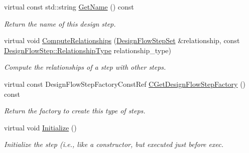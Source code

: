 \begin{DoxyCompactItemize}
virtual const std\+::string \hyperlink{classRTLCharacterization_a0b41ce2d4af25aa22e41dd9af50f1b0b}{Get\+Name} () const
\begin{DoxyCompactList}\small\item\em Return the name of this design step. \end{DoxyCompactList}\item 
virtual void \hyperlink{classRTLCharacterization_acb29748095419798f3ff059e7b00099f}{Compute\+Relationships} (\hyperlink{classDesignFlowStepSet}{Design\+Flow\+Step\+Set} \&relationship, const \hyperlink{classDesignFlowStep_a723a3baf19ff2ceb77bc13e099d0b1b7}{Design\+Flow\+Step\+::\+Relationship\+Type} relationship\+\_\+type)
\begin{DoxyCompactList}\small\item\em Compute the relationships of a step with other steps. \end{DoxyCompactList}\item 
virtual const Design\+Flow\+Step\+Factory\+Const\+Ref \hyperlink{classRTLCharacterization_a4a947126e0eb8dd4eb164887a252d597}{C\+Get\+Design\+Flow\+Step\+Factory} () const
\begin{DoxyCompactList}\small\item\em Return the factory to create this type of steps. \end{DoxyCompactList}\item 
virtual void \hyperlink{classRTLCharacterization_a5763e2ae1d1252dedf0b282a55526fd3}{Initialize} ()
\begin{DoxyCompactList}\small\item\em Initialize the step (i.\+e., like a constructor, but executed just before exec. \end{DoxyCompactList}\end{DoxyCompactItemize}

